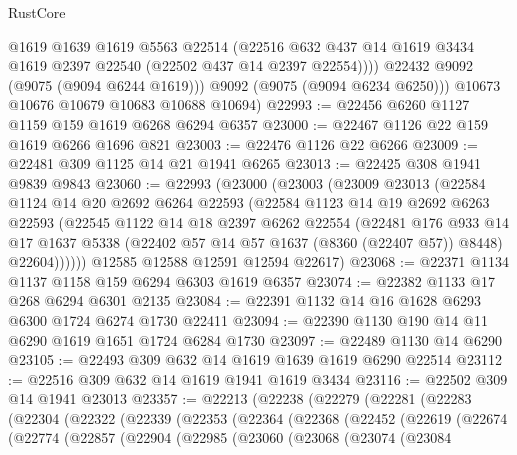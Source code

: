 \begin{lexlean}{RustCore}
\begin{coremodule}
              @1619
              @1639
              @1619
              @5563
              @22514
              (@22516 @632 @437 @14 @1619 @3434 @1619 @2397 @22540 (@22502 @437 @14 @2397 @22554))))
          @22432
          @9092
          (@9075 (@9094 @6244 @1619)))
        @9092
        (@9075 (@9094 @6234 @6250)))
      @10673
      @10676
      @10679
      @10683
      @10688
      @10694)
@22993 := @22456 @6260 @1127 @1159 @159 @1619 @6268 @6294 @6357
@23000 := @22467 @1126 @22 @159 @1619 @6266 @1696 @821
@23003 := @22476 @1126 @22 @6266
@23009 := @22481 @309 @1125 @14 @21 @1941 @6265
@23013 := @22425 @308 @1941 @9839 @9843
@23060 := @22993
    (@23000
      (@23003
        (@23009
          @23013
          (@22584
            @1124
            @14
            @20
            @2692
            @6264
            @22593
            (@22584
              @1123
              @14
              @19
              @2692
              @6263
              @22593
              (@22545
                @1122
                @14
                @18
                @2397
                @6262
                @22554
                (@22481
                  @176
                  @933
                  @14
                  @17
                  @1637
                  @5338
                  (@22402 @57 @14 @57 @1637 (@8360 (@22407 @57)) @8448)
                  @22604))))))
      @12585
      @12588
      @12591
      @12594
      @22617)
@23068 := @22371 @1134 @1137 @1158 @159 @6294 @6303 @1619 @6357
@23074 := @22382 @1133 @17 @268 @6294 @6301 @2135
@23084 := @22391 @1132 @14 @16 @1628 @6293 @6300 @1724 @6274 @1730 @22411
@23094 := @22390 @1130 @190 @14 @11 @6290 @1619 @1651 @1724 @6284 @1730
@23097 := @22489 @1130 @14 @6290
@23105 := @22493 @309 @632 @14 @1619 @1639 @1619 @6290 @22514
@23112 := @22516 @309 @632 @14 @1619 @1941 @1619 @3434
@23116 := @22502 @309 @14 @1941 @23013
@23357 := @22213
    (@22238
      (@22279
        (@22281
          (@22283
            (@22304
              (@22322
                (@22339
                  (@22353
                    (@22364
                      (@22368
                        (@22452
                          (@22619
                            (@22674
                              (@22774
                                (@22857
                                  (@22904
                                    (@22985
                                      (@23060
                                        (@23068
                                          (@23074
                                            (@23084

\end{coremodule}
\end{lexlean}
